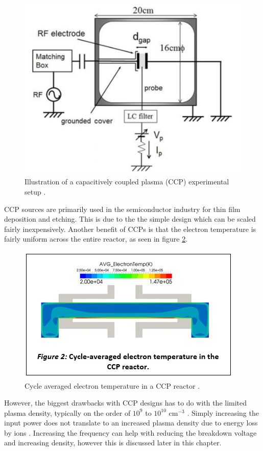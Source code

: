 \begin{figure}[h!]
	\centering
	\includegraphics[width=0.6\linewidth]{chapter_2/figures/CCP_reactor.png}
	\caption{Illustration of a capacitively coupled plasma (CCP) experimental setup \cite{Ohtsu2018}.}
	\label{fig:CCP_reactor}
\end{figure} 

CCP sources are primarily used in the semiconductor industry for thin film deposition and etching. This is due to the the simple design which can be scaled fairly inexpensively. Another benefit of CCPs is that the electron temperature is fairly uniform across the entire reactor, as seen in figure \ref{fig:ccp_electron_temp}.

\begin{figure}[h!]
	\centering
	\includegraphics[width=0.6\linewidth]{chapter_2/figures/ccp_electron_temp.jpg}
	\caption{Cycle averaged electron temperature in a CCP reactor \cite{esgee_tech_2017}.}
	\label{fig:ccp_electron_temp}
\end{figure} 

However, the biggest drawbacks with CCP designs has to do with the limited plasma density, typically on the order of $10^{9}$ to $10^{10}$ cm$^{-3}$ \cite{Denpoh2021, }. Simply increasing the input power does not translate to an increased plasma density due to energy loss by ions \cite{Iza2008}. Increasing the frequency can help with reducing the breakdown voltage and increasing density, however this is discussed later in this chapter.


